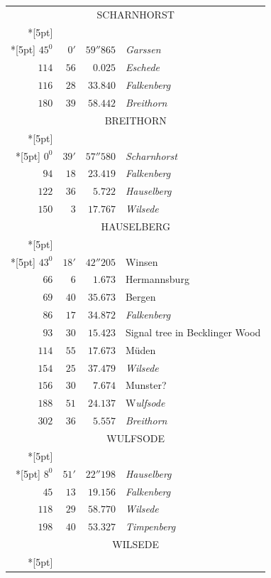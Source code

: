 \clearpage
{}%
\begingroup
\fontsize{10.5}{13}\selectfont
\setlength{\tabcolsep}{3pt}
\setlength{\LTpre}{2pt}
\setlength{\LTpost}{2pt}
\begin{longtable}{@{}rrrp{.61\linewidth}@{}}
\multicolumn{4}{c}{\strut SCHARNHORST}\\*[5pt]
\multicolumn{4}{c}{\(-133392.348\)\qquad\(-21418.103\)}\\*[5pt]
\(45^{0}\)&\(0'\)&\(59''865\)&\raggedright \textit{Garssen}\tabularnewline
\(114\)&\(56\)&\(0.025\)&\raggedright \textit{Eschede}\tabularnewline
\(116\)&\(28\)&\(33.840\)&\raggedright \textit{Falkenberg}\tabularnewline
\(180\)&\(39\)&\(58.442\)&\raggedright \textit{Breithorn}\tabularnewline
\multicolumn{4}{c}{\strut BREITHORN}\\*[5pt]
\multicolumn{4}{c}{\(-144611.129\)\qquad\(-21548.543\)}\\*[5pt]
\(0^{0}\)&\(39'\)&\(57''580\)&\raggedright \textit{Scharnhorst}\tabularnewline
\(94\)&\(18\)&\(23.419\)&\raggedright \textit{Falkenberg}\tabularnewline
\(122\)&\(36\)&\(5.722\)&\raggedright \textit{Hauselberg}\tabularnewline
\(150\)&\(3\)&\(17.767\)&\raggedright \textit{Wilsede}\tabularnewline
\multicolumn{4}{c}{\strut HAUSELBERG}\\*[5pt]
\multicolumn{4}{c}{\(-148006.363\)\qquad\(-16239.880\)}\\*[5pt]
\(43^{0}\)&\(18'\)&\(42''205\)&\raggedright Winsen\tabularnewline
\(66\)&\(6\)&\(1.673\)&\raggedright Hermannsburg\tabularnewline
\(69\)&\(40\)&\(35.673\)&\raggedright Bergen\tabularnewline
\(86\)&\(17\)&\(34.872\)&\raggedright \textit{Falkenberg}\tabularnewline
\(93\)&\(30\)&\(15.423\)&\raggedright Signal tree in Becklinger Wood\tabularnewline
\(114\)&\(55\)&\(17.673\)&\raggedright Müden\tabularnewline
\(154\)&\(25\)&\(37.479\)&\raggedright \textit{Wilsede}\tabularnewline
\(156\)&\(30\)&\(7.674\)&\raggedright Munster?\tabularnewline
\(188\)&\(51\)&\(24.137\)&\raggedright W\textit{ulfsode}\tabularnewline
\(302\)&\(36\)&\(5.557\)&\raggedright \textit{Breithorn}\tabularnewline
\multicolumn{4}{c}{\strut WULFSODE}\\*[5pt]
\multicolumn{4}{c}{\(-171465.593\)\qquad\(-19895.232\)}\\*[5pt]
\(8^{0}\)&\(51'\)&\(22''198\)&\raggedright \textit{Hauselberg}\tabularnewline
\(45\)&\(13\)&\(19.156\)&\raggedright \textit{Falkenberg}\tabularnewline
\(118\)&\(29\)&\(58.770\)&\raggedright \textit{Wilsede}\tabularnewline
\(198\)&\(40\)&\(53.327\)&\raggedright \textit{Timpenberg}\tabularnewline
\multicolumn{4}{c}{\strut WILSEDE}\\*[5pt]

\end{longtable}
